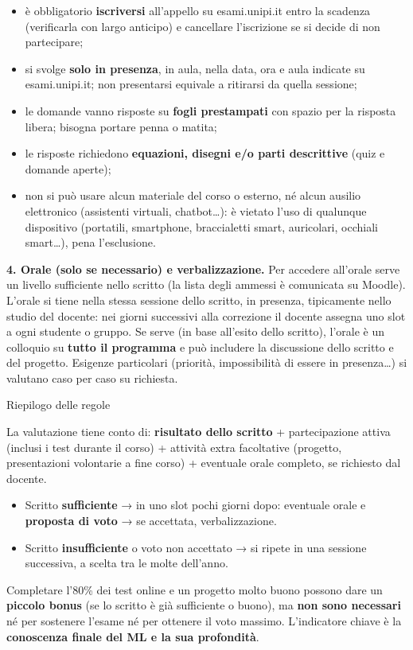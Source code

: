 \begin{itemize}
\tightlist
\item
  è obbligatorio \textbf{iscriversi} all'appello su esami.unipi.it entro
  la scadenza (verificarla con largo anticipo) e cancellare l'iscrizione
  se si decide di non partecipare;
\item
  si svolge \textbf{solo in presenza}, in aula, nella data, ora e aula
  indicate su esami.unipi.it; non presentarsi equivale a ritirarsi da
  quella sessione;
\item
  le domande vanno risposte su \textbf{fogli prestampati} con spazio per
  la risposta libera; bisogna portare penna o matita;
\item
  le risposte richiedono \textbf{equazioni, disegni e/o parti
  descrittive} (quiz e domande aperte);
\item
  non si può usare alcun materiale del corso o esterno, né alcun ausilio
  elettronico (assistenti virtuali, chatbot\ldots): è vietato l'uso di
  qualunque dispositivo (portatili, smartphone, braccialetti smart,
  auricolari, occhiali smart\ldots), pena l'esclusione.
\end{itemize}

\textbf{4. Orale (solo se necessario) e verbalizzazione.} Per accedere
all'orale serve un livello sufficiente nello scritto (la lista degli
ammessi è comunicata su Moodle). L'orale si tiene nella stessa sessione
dello scritto, in presenza, tipicamente nello studio del docente: nei
giorni successivi alla correzione il docente assegna uno slot a ogni
studente o gruppo. Se serve (in base all'esito dello scritto), l'orale è
un colloquio su \textbf{tutto il programma} e può includere la
discussione dello scritto e del progetto. Esigenze particolari
(priorità, impossibilità di essere in presenza\ldots) si valutano caso
per caso su richiesta.

\begin{boxabstract}{Riepilogo delle regole}

La valutazione tiene conto di: \textbf{risultato dello scritto} +
partecipazione attiva (inclusi i test durante il corso) + attività extra
facoltative (progetto, presentazioni volontarie a fine corso) +
eventuale orale completo, se richiesto dal docente.

\begin{itemize}
\tightlist
\item
  Scritto \textbf{sufficiente} → in uno slot pochi giorni dopo:
  eventuale orale e \textbf{proposta di voto} → se accettata,
  verbalizzazione.
\item
  Scritto \textbf{insufficiente} o voto non accettato → si ripete in una
  sessione successiva, a scelta tra le molte dell'anno.
\end{itemize}

Completare l'80\% dei test online e un progetto molto buono possono dare
un \textbf{piccolo bonus} (se lo scritto è già sufficiente o buono), ma
\textbf{non sono necessari} né per sostenere l'esame né per ottenere il
voto massimo. L'indicatore chiave è la \textbf{conoscenza finale del ML
e la sua profondità}.

\end{boxabstract}

